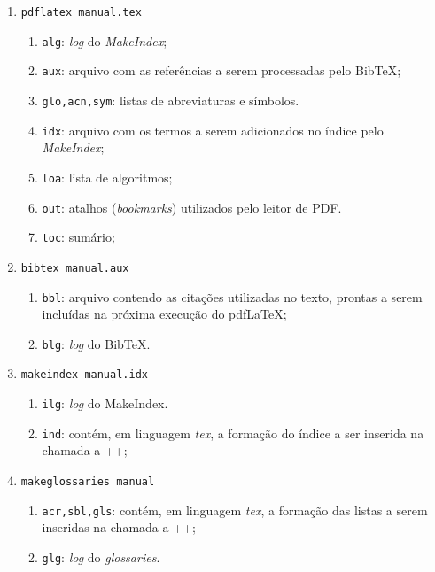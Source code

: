 \documentclass[xindy,rascunho]{fei}
\begin{document}
\begin{teorema}
	\begin{enumerate}
	
	\item\verb+pdflatex manual.tex+
	\begin{enumerate}
	\item \texttt{alg}: \emph{log} do \emph{MakeIndex};
	\item \texttt{aux}: arquivo com as referências a serem processadas pelo Bib\TeX;
	\item \texttt{glo,acn,sym}: listas de abreviaturas e símbolos.
	\item \texttt{idx}: arquivo com os termos a serem adicionados no índice pelo \emph{MakeIndex};
	\item \texttt{loa}: lista de algoritmos;
	\item \texttt{out}: atalhos (\emph{bookmarks}) utilizados pelo leitor de PDF.
	\item \texttt{toc}: sumário;
	\end{enumerate}	
	
	\item\verb+bibtex manual.aux+
	\begin{enumerate}
	\item \texttt{bbl}: arquivo contendo as citações utilizadas no texto, prontas a serem incluídas na próxima execução do pdf\LaTeX;
	\item \texttt{blg}: \emph{log} do Bib\TeX.
	\end{enumerate}	
	
	\item\verb+makeindex manual.idx+
	\begin{enumerate}
	\item \texttt{ilg}: \emph{log} do MakeIndex.
	\item \texttt{ind}: contém, em linguagem \emph{tex}, a formação do índice a ser inserida na chamada a \latexinline+\printindex+;
	\end{enumerate}	
	
	\item\verb+makeglossaries manual+
	\begin{enumerate}
	\item \texttt{acr,sbl,gls}:  contém, em linguagem \emph{tex}, a formação das listas a serem inseridas na chamada a \latexinline+\printglossaries+;
	\item \texttt{glg}: \emph{log} do \emph{glossaries}.
	\end{enumerate}
	\end{enumerate}
	

\end{teorema}
\end{document}
